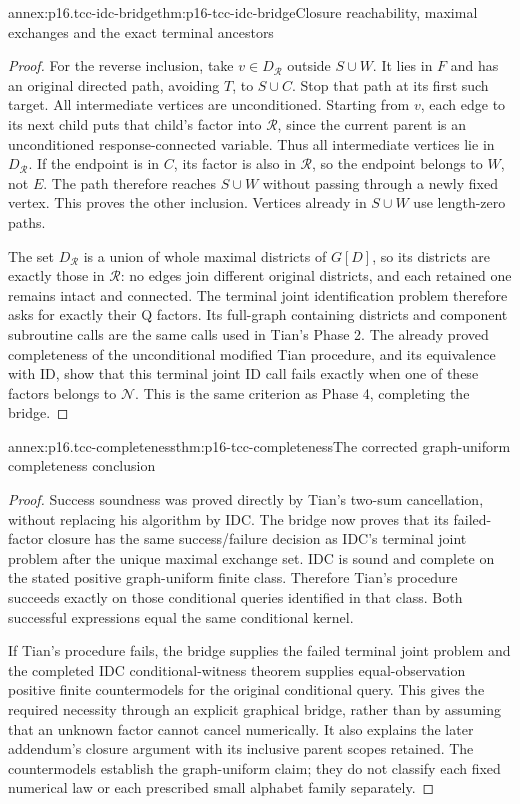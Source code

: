 \begin{annexitem}{annex:p16.tcc-idc-bridge}{thm:p16-tcc-idc-bridge}{Closure reachability, maximal exchanges and the exact terminal ancestors}
\begin{proof}
For the reverse inclusion, take \(v\in D_{\mathcal R}\)
outside \(S\cup W\). It lies in \(F\) and has an
original directed path, avoiding \(T\), to \(S\cup C\).
Stop that path at its first such target. All intermediate
vertices are unconditioned. Starting from \(v\), each edge
to its next child puts that child's factor into \(\mathcal R\),
since the current parent is an unconditioned response-connected
variable. Thus all intermediate vertices lie in \(D_{\mathcal R}\).
If the endpoint is in \(C\), its factor is also in
\(\mathcal R\), so the endpoint belongs to \(W\), not
\(E\). The path therefore reaches \(S\cup W\) without
passing through a newly fixed vertex. This proves the other
inclusion. Vertices already in \(S\cup W\) use length-zero paths.

The set \(D_{\mathcal R}\) is a union of whole maximal
districts of \(G[D]\), so its districts are exactly those
in \(\mathcal R\): no edges join different original districts,
and each retained one remains intact and connected. The terminal
joint identification problem therefore asks for exactly their
Q factors. Its full-graph containing districts and component
subroutine calls are the same calls used in Tian's Phase 2.
The already proved completeness of the unconditional modified
Tian procedure, and its equivalence with ID, show that this
terminal joint ID call fails exactly when one of these factors
belongs to \(\mathcal N\). This is the same criterion as
Phase 4, completing the bridge.
\end{proof}
\end{annexitem}

\begin{annexitem}{annex:p16.tcc-completeness}{thm:p16-tcc-completeness}{The corrected graph-uniform completeness conclusion}
\begin{proof}
Success soundness was proved directly by Tian's two-sum cancellation,
without replacing his algorithm by IDC. The bridge now proves
that its failed-factor closure has the same success/failure
decision as IDC's terminal joint problem after the unique maximal
exchange set. IDC is sound and complete on the stated positive
graph-uniform finite class. Therefore Tian's procedure succeeds
exactly on those conditional queries identified in that class.
Both successful expressions equal the same conditional kernel.

If Tian's procedure fails, the bridge supplies the failed terminal
joint problem and the completed IDC conditional-witness theorem
supplies equal-observation positive finite countermodels for the
original conditional query. This gives the required necessity
through an explicit graphical bridge, rather than by assuming
that an unknown factor cannot cancel numerically. It also explains
the later addendum's closure argument with its inclusive parent
scopes retained. The countermodels establish the graph-uniform
claim; they do not classify each fixed numerical law or each
prescribed small alphabet family separately.
\end{proof}
\end{annexitem}

